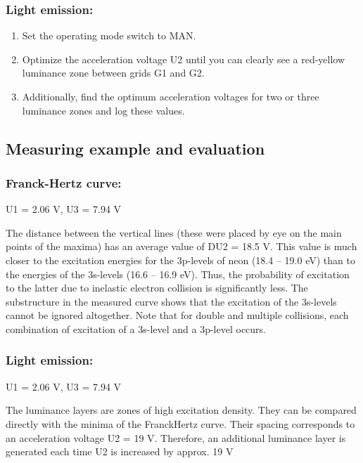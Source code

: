 \documentclass[a4paper, 10pt, nanum]{CSUniSchoolLabReport}
\begin{document}
\subsubsection{Light emission:}
	\begin{enumerate}[label=\arabic*.]
		\item Set the operating mode switch to MAN. 
		\item Optimize the acceleration voltage U2 until you can clearly see a red-yellow luminance zone between grids G1 and G2. 
		\item Additionally, find the optimum acceleration voltages for two or three luminance zones and log these values. 
	\end{enumerate}

\subsection{Measuring example and evaluation}

\subsubsection{Franck-Hertz curve:}
	U1 = 2.06 V, U3 = 7.94 V 

	The distance between the vertical lines (these were placed by eye on the main points of the maxima) has an average value of DU2 = 18.5 V. This value is much closer to the excitation energies for the 3p-levels of neon (18.4 – 19.0 eV) than to the energies of the 3s-levels (16.6 – 16.9 eV). Thus, the probability of excitation to the latter due to inelastic electron collision is significantly less. The substructure in the measured curve shows that the excitation of the 3s-levels cannot be ignored altogether. Note that for double and multiple collisions, each combination of excitation of a 3s-level and a 3p-level occurs. 

\subsubsection{Light emission:}
	U1 = 2.06 V, U3 = 7.94 V 

	The luminance layers are zones of high excitation density. They can be compared directly with the minima of the FranckHertz curve. Their spacing corresponds to an acceleration voltage U2 = 19 V. Therefore, an additional luminance layer is generated each time U2 is increased by approx. 19 V 

\end{document}
